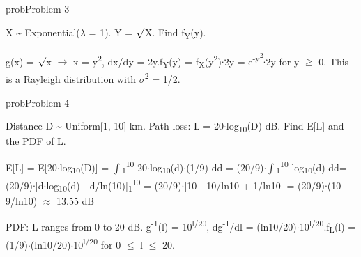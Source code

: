 \begin{PSbox}[unbreakable]{prob}{Problem 3}

X \textasciitilde{} Exponential(\ensuremath{\lambda} = 1). Y = \ensuremath{\surd}X. Find f\textsubscript{Y}(y).

\PSsolution{} g(x) = \ensuremath{\surd}x \ensuremath{\to} x = y\textsuperscript{2}, dx/dy = 2y.\PSbr{}f\textsubscript{Y}(y) = f\textsubscript{X}(y\textsuperscript{2})\ensuremath{\cdot}\textbar{}2y\textbar{} = e\textsuperscript{-y\textsuperscript{2}}\ensuremath{\cdot}2y for y \ensuremath{\ge} 0. This is a Rayleigh distribution with \ensuremath{\sigma}\textsuperscript{2} = 1/2.

\end{PSbox}

\begin{PSbox}[unbreakable]{prob}{Problem 4}

Distance D \textasciitilde{} Uniform[1, 10] km. Path loss: L = 20\ensuremath{\cdot}log\textsubscript{10}(D) dB. Find E[L] and the PDF of L.

\PSsolution{} E[L] = E[20\ensuremath{\cdot}log\textsubscript{10}(D)] = \ensuremath{\int}\textsubscript{1}\textsuperscript{10} 20\ensuremath{\cdot}log\textsubscript{10}(d)\ensuremath{\cdot}(1/9) dd = (20/9)\ensuremath{\cdot}\ensuremath{\int}\textsubscript{1}\textsuperscript{10} log\textsubscript{10}(d) dd\PSbr{}= (20/9)\ensuremath{\cdot}[d\ensuremath{\cdot}log\textsubscript{10}(d) - d/ln(10)]\textsubscript{1}\textsuperscript{10} = (20/9)\ensuremath{\cdot}[10 - 10/ln10 + 1/ln10] = (20/9)\ensuremath{\cdot}(10 - 9/ln10) \ensuremath{\approx} 13.55 dB

PDF: L ranges from 0 to 20 dB. g\textsuperscript{-1}(l) = 10\textsuperscript{l/20}, \textbar{}dg\textsuperscript{-1}/dl\textbar{} = (ln10/20)\ensuremath{\cdot}10\textsuperscript{l/20}.\PSbr{}f\textsubscript{L}(l) = (1/9)\ensuremath{\cdot}(ln10/20)\ensuremath{\cdot}10\textsuperscript{l/20} for 0 \ensuremath{\le} l \ensuremath{\le} 20.

\end{PSbox}

